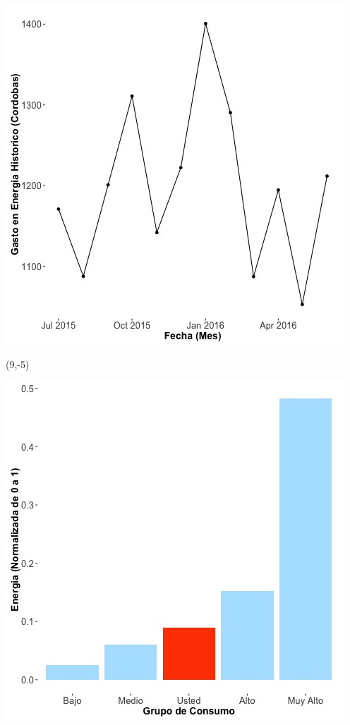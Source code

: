 \documentclass{article}\usepackage[]{graphicx}\usepackage[]{color}
\newenvironment{knitrout}{}{} %
\begin{document}
\begin{knitrout}
\color{fgcolor}
\includegraphics[scale=0.65]{figure/A18_historico_cordobas} 
\end{knitrout}

 \begin{textblock}{1}(9,-5)
\begin{minipage}{20em}
\begingroup

\endgroup
\end{minipage}
\end{textblock}


\begin{knitrout}
\color{fgcolor}
\includegraphics[scale=0.65]{figure/A18_neighbor_plot} 
\end{knitrout}
\end{document}
